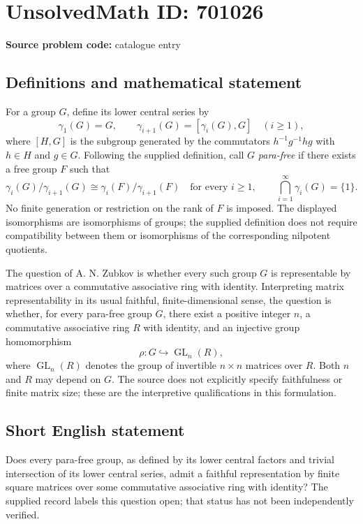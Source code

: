\documentclass[11pt]{article}
\begin{document}
\section*{UnsolvedMath ID: 701026}
\textbf{Source problem code:} catalogue entry
\subsection{Definitions and mathematical statement}
For a group \(G\), define its lower central series by
\[
\gamma_1(G)=G,\qquad \gamma_{i+1}(G)=[\gamma_i(G),G]\quad(i\geq 1),
\]
where \([H,G]\) is the subgroup generated by the commutators \(h^{-1}g^{-1}hg\) with \(h\in H\) and \(g\in G\). Following the supplied definition, call \(G\) \emph{para-free} if there exists a free group \(F\) such that
\[
\gamma_i(G)/\gamma_{i+1}(G)\cong
\gamma_i(F)/\gamma_{i+1}(F)\quad\text{for every }i\geq 1,
\qquad
\bigcap_{i=1}^{\infty}\gamma_i(G)=\{1\}.
\]
No finite generation or restriction on the rank of \(F\) is imposed. The displayed isomorphisms are isomorphisms of groups; the supplied definition does not require compatibility between them or isomorphisms of the corresponding nilpotent quotients.

The question of A. N. Zubkov is whether every such group \(G\) is representable by matrices over a commutative associative ring with identity. Interpreting matrix representability in its usual faithful, finite-dimensional sense, the question is whether, for every para-free group \(G\), there exist a positive integer \(n\), a commutative associative ring \(R\) with identity, and an injective group homomorphism
\[
\rho:G\hookrightarrow\operatorname{GL}_n(R),
\]
where \(\operatorname{GL}_n(R)\) denotes the group of invertible \(n\times n\) matrices over \(R\). Both \(n\) and \(R\) may depend on \(G\). The source does not explicitly specify faithfulness or finite matrix size; these are the interpretive qualifications in this formulation.
\subsection{Short English statement}
Does every para-free group, as defined by its lower central factors and trivial intersection of its lower central series, admit a faithful representation by finite square matrices over some commutative associative ring with identity? The supplied record labels this question open; that status has not been independently verified.
\end{document}

